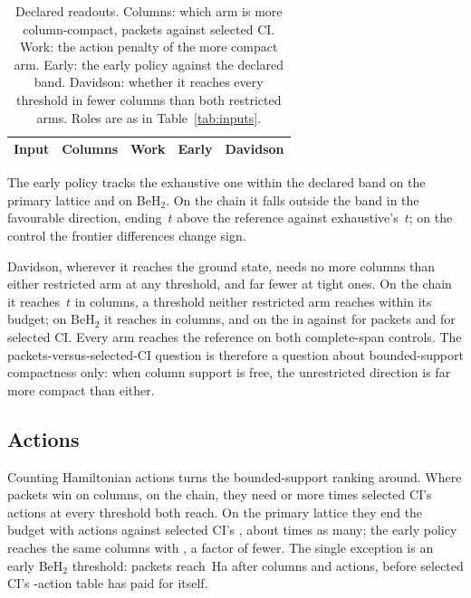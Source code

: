 \documentclass[aps,pra,reprint,superscriptaddress,nofootinbib,floatfix,
  showkeys,raggedbottom]{revtex4-2}
\newcommand{\tightcolumns}{\setlength{\tabcolsep}{3.2pt}}
\begin{document}
\begin{table}[t]
\caption{Declared readouts. Columns: which arm is more column-compact, packets
against selected CI. Work: the action penalty of the more compact arm. Early:
the early policy against the declared band. Davidson: whether it reaches every
threshold in fewer columns than both restricted arms. Roles are as in
Table~\ref{tab:inputs}.}
\label{tab:readouts}
\begin{ruledtabular}
\tightcolumns
\begin{tabular}{lllll}
Input & Columns & Work & Early & Davidson \\
\hline

\end{tabular}
\end{ruledtabular}
\end{table}

The early policy tracks the exhaustive one within the declared band on the
primary lattice and on BeH$_2$. On the chain it falls outside the band in the
favourable direction, ending \pkChainEarlyFinalError{}\,$t$ above the
reference against exhaustive's \pkChainPacketsFinalError{}\,$t$; on the
\pkLadderName{} control the frontier differences change sign.

Davidson, wherever it reaches the ground state, needs no more columns than
either restricted arm at any threshold, and far fewer at tight ones. On the
chain it reaches \pkThresholdTight\,$t$ in
\pkChainDavidsonColumnsTight{} columns, a threshold neither restricted arm
reaches within its budget; on BeH$_2$ it reaches \pkTightTarget{} in
\pkBerylliumDavidsonColumnsTight{} columns, and on the \pkLadderName{} in
\pkLadderDavidsonColumnsTight{} against \pkLadderPacketsColumnsTight{} for
packets and \pkLadderSciColumnsTight{} for selected CI. Every arm reaches the
reference on both complete-span controls. The packets-versus-selected-CI
question is therefore a question about bounded-support compactness only: when
column support is free, the unrestricted direction is far more compact than
either.

\subsection{Actions}
\label{sec:actions}

Counting Hamiltonian actions turns the bounded-support ranking around. Where
packets win on columns, on the chain, they need \pkChainMinActionRatio{} or
more times selected CI's actions at every threshold both reach. On the
primary lattice they end the budget with \pkPrimaryPacketsActions{} actions
against selected CI's \pkPrimarySciActions{}, about \pkPrimaryActionRatio{}
times as many; the early policy reaches the same columns with
\pkPrimaryEarlyActions{}, a factor of \pkPrimaryEarlyActionFactor{} fewer. The
single exception is an early BeH$_2$ threshold: packets reach \pkThresholdTenth\,Ha after
\pkBerylliumColumnsTenth{} columns and \pkBerylliumPacketsActionsTenth{}
actions, before selected CI's \pkBerylliumSciActionsTenth{}-action table has
paid for itself.
\end{document}
